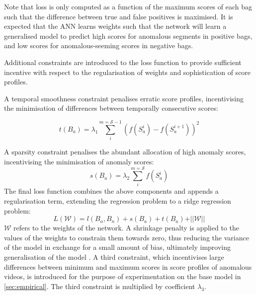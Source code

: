 \documentclass[sigplan,authorversion,nonacm, 9pt]{acmart}
\begin{document}
Note that loss is only computed as a function of the maximum scores of each bag such that the difference between true and false positives is maximised. It is expected that the ANN learns weights such that the network will learn a generalised model to predict high scores for anomalous segments in positive bags, and low scores for anomalous-seeming scores in negative bags.
\par
Additional constraints are introduced to the loss function to provide sufficient incentive with respect to the regularisation of weights and sophistication of score profiles.
\par
A temporal smoothness constraint penalises erratic score profiles, incentivising the minimisation of differences between temporally consecutive scores:

\begin{equation}
    t(B_a) = \lambda_{1} \sum_{i}^{m=\mathcal{S}-1} (f(S_{a}^{i})-f(S_{a}^{i+1}))^{2}
\end{equation}

A sparsity constraint penalises the abundant allocation of high anomaly scores, incentivising the minimisation of anomaly scores:
\begin{equation}
    s(B_a) = \lambda_{2} \sum_{i}^{m=\mathcal{S}} f(S_{a}^{i})
\end{equation}
The final loss function combines the above components and appends a regularisation term, extending the regression problem to a ridge regression problem:  
\begin{equation} \label{eq:losseq}
    L(\mathcal{W}) = l(B_a, B_n) + s(B_a) + t(B_a) + \vert\vert \mathcal{W} \vert\vert
\end{equation}
$\mathcal{W}$ refers to the weights of the network. A shrinkage penalty is applied to the values of the weights to constrain them towards zero, thus reducing the variance of the model in exchange for a small amount of bias, ultimately improving generalisation of the model \cite{islr}. A third constraint, which incentivises large differences between minimum and maximum scores in score profiles of anomalous videos, is introduced for the purpose of experimentation on the base model in \ref{sec:empirical}. The third constraint is multiplied by coefficient $\lambda_3$.  
\end{document}
